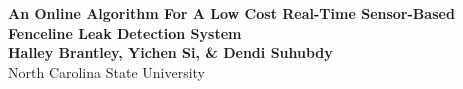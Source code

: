 \documentclass[a0, landscape]{a0poster}
\begin{document}



\begin{minipage}[b]{1\linewidth}
\Huge \textbf{An Online Algorithm For A Low Cost Real-Time Sensor-Based Fenceline Leak Detection System} \color{Black}\\ %
\Large \textbf{Halley Brantley, Yichen Si, \& Dendi Suhubdy}\\[0.5cm] %
\large  North Carolina State University \\[0.4cm] %
\end{minipage}

\vspace{-20mm}
\end{document}
